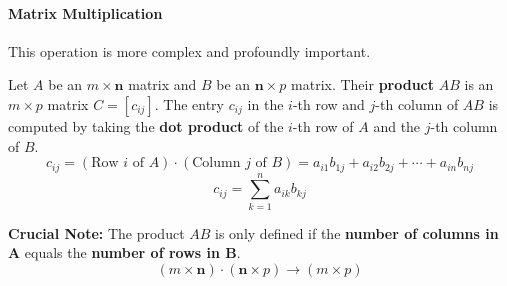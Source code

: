 \paragraph{Matrix Multiplication}
This operation is more complex and profoundly important.

\begin{definition}
Let $A$ be an $m \times \mathbf{n}$ matrix and $B$ be an $\mathbf{n} \times p$ matrix. Their \textbf{product} $AB$ is an $m \times p$ matrix $C = [c_{ij}]$.
The entry $c_{ij}$ in the $i$-th row and $j$-th column of $AB$ is computed by taking the \textbf{dot product} of the $i$-th row of $A$ and the $j$-th column of $B$.
\[ c_{ij} = (\text{Row } i \text{ of } A) \cdot (\text{Column } j \text{ of } B) = a_{i1}b_{1j} + a_{i2}b_{2j} + \cdots + a_{in}b_{nj} \]
\[ c_{ij} = \sum_{k=1}^{n} a_{ik}b_{kj} \]
\end{definition}

\textbf{Crucial Note:} The product $AB$ is only defined if the \textbf{number of columns in A} equals the \textbf{number of rows in B}.
\[
(m \times \mathbf{n}) \cdot (\mathbf{n} \times p) \to (m \times p)
\]

